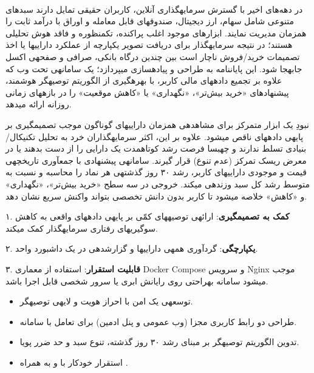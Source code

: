 
در دهه\textsuperscript{‌}های اخیر با گسترش سرمایه\rtl{-}گذاری آنلاین، کاربران حقیقی تمایل دارند سبدهای متنوعی شامل سهام، ارز دیجیتال، صندوق\rtl{-}های قابل معامله و اوراق با درآمد ثابت را همزمان مدیریت نمایند. ابزارهای موجود اغلب پراکنده، تک\rtl{-}منظوره و فاقد هوش تحلیلی هستند؛ در نتیجه سرمایه\rtl{-}گذار برای دریافت تصویر یکپارچه از عملکرد دارایی\rtl{-}ها یا اخذ تصمیمات خرید/فروش ناچار است بین چندین درگاه بانکی، صرافی و صفحه\rtl{-}ی اکسل جابه\rtl{-}جا شود. این پایان\rtl{-}نامه به طراحی و پیاده\rtl{-}سازی  می\rtl{-}پردازد؛ یک سامانه\rtl{-}ی تحت وب که علاوه بر تجمیع داده\rtl{-}های مالی کاربر، با بهره\rtl{-}گیری از الگوریتم توصیه\rtl{-}گر هوشمند، پیشنهادهای «خرید بیش‌تر»، «نگهداری» یا «کاهش موقعیت» را در بازه\rtl{-}های زمانی روزانه ارائه می\rtl{-}دهد.

نبودِ یک ابزار متمرکز برای مشاهده\rtl{-}ی هم\rtl{-}زمان دارایی\rtl{-}های گوناگون موجب تصمیم\rtl{-}گیری بر پایه\rtl{-}ی داده\rtl{-}های ناقص می\rtl{-}شود. علاوه بر این، اکثر سرمایه\rtl{-}گذاران خرد به تحلیل تکنیکال/بنیادی تسلط ندارند و چه\rtl{-}بسا فرصت رشد کوتاه\rtl{-}مدت یک دارایی را از دست بدهند یا در معرض ریسک تمرکز (عدم تنوع) قرار گیرند. سامانه\rtl{-}ی پیشنهادی با جمع\rtl{-}آوری تاریخچه\rtl{-}ی قیمت و موجودی دارایی\rtl{-}های کاربر، رشد ۳۰ روز گذشته\rtl{-}ی هر نماد را محاسبه و نسبت به متوسط رشد کل سبد وزن\rtl{-}دهی می\rtl{-}کند. خروجی در سه سطح «خرید بیش‌تر»، «نگهداری» و «کاهش» خلاصه می\rtl{-}شود تا کاربر بدون دانش تخصصی بتواند واکنش سریع نشان دهد.

۱. \textbf{کمک به تصمیم\rtl{-}گیری}: ارائه\rtl{-}ی توصیه\rtl{-}های کمّی بر پایه\rtl{-}ی داده\rtl{-}های واقعی به کاهش سوگیری\rtl{-}های رفتاری سرمایه\rtl{-}گذار کمک می\rtl{-}کند.

۲. \textbf{یکپارچگی}: گردآوری همه\rtl{-}ی دارایی\rtl{-}ها و گزارش\rtl{-}دهی در یک داشبورد واحد.

۳. \textbf{قابلیت استقرار}: استفاده از معماری Docker Compose و سرویس Nginx موجب می\rtl{-}شود سامانه به\rtl{-}راحتی روی رایانش ابری یا سرور شخصی قابل اجرا باشد.

\begin{itemize}
  \item توسعه\rtl{-}ی یک  امن با احراز هویت  و لایه\rtl{-}ی توصیه\rtl{-}گر.
  \item طراحی دو رابط کاربری مجزا (وب عمومی و پنل ادمین) برای تعامل با سامانه.
  \item تدوین الگوریتم توصیه\rtl{-}گر بر مبنای رشد ۳۰ روز گذشته، تنوع سبد و حد ضرر پویا.
  \item استقرار خودکار با  و  به همراه . 
\end{itemize}


